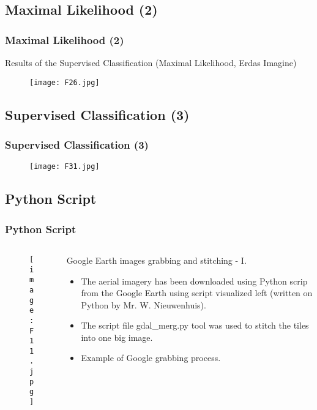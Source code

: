 \documentclass[pdflatex,compress]{beamer}
\begin{document}
\subsection{Maximal Likelihood (2)}
\begin{frame}\frametitle{Maximal Likelihood (2)}
\scriptsize{Results of the Supervised Classification (Maximal Likelihood, Erdas Imagine)}
\begin{figure}[H]
	\centering
		\texttt{[image: F26.jpg]}
\end{figure}
\end{frame}


\subsection{Supervised Classification (3)}
\begin{frame}\frametitle{Supervised Classification (3)}
\begin{figure}[H]
	\centering
		\texttt{[image: F31.jpg]}
\end{figure}
\end{frame}

\subsection{Python Script}
\begin{frame}\frametitle{Python Script}

\begin{minipage}[0.4\textheight]{\textwidth}
\begin{columns}[T]
\begin{column}{0.6\textwidth}
\begin{figure}[H]
	\centering
		\texttt{[image: F11.jpg]}
\end{figure}
\end{column}
\begin{column}{0.4\textwidth}
\scriptsize{Google Earth images grabbing and stitching - I.
\begin{itemize}
	\item The aerial imagery has been downloaded using Python scrip from the Google Earth using script visualized left (written on Python by Mr. W. Nieuwenhuis).
	\item The script file gdal\_merg.py tool was used to stitch the tiles into one big image. 
	\item Example of Google grabbing process.
\end{itemize}}
\end{column}
\end{columns}
\end{minipage}
\end{frame}
\end{document}
